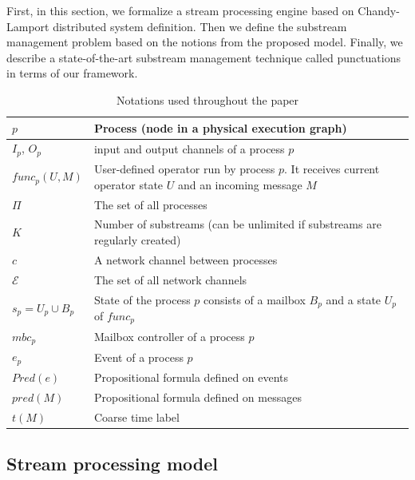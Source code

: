 \label{fs-acker-preliminaries}

First, in this section, we formalize a stream processing engine based on Chandy-Lamport distributed system definition. Then we define the substream management problem based on the notions from the proposed model. Finally, we describe a state-of-the-art substream management technique called punctuations in terms of our framework.

\begin{table}[!b]
    \caption{Notations used throughout the paper}
    \footnotesize
    \begin{tabular}{l|p{5cm}}
        \hline
        $p$ & Process (node in a physical execution graph) \\ 
        \hline
        $I_p$, $O_p$ & input and output channels of a process $p$ \\ 
        \hline
        $func_p(U, M)$ & User-defined operator run by process $p$. It receives current operator state $U$ and an incoming message $M$ \\ 
        \hline
        $\Pi$ & The set of all processes  \\
        \hline
        $K$ & Number of substreams (can be unlimited if substreams are regularly created) \\
        \hline
        $c$ & A network channel between processes  \\
        \hline
        $\mathcal{E}$ & The set of all network channels  \\
        \hline
        $s_p = U_p \cup B_p$ & State of the process $p$ consists of a mailbox $B_p$ and a state $U_p$ of $func_p$ \\
        \hline
        $mbc_{p}$ & Mailbox controller of a process $p$ \\
        \hline
        $e_{p}$ & Event of a process $p$ \\
        \hline
        $Pred(e)$ & Propositional formula defined on events \\
        \hline
        $pred(M)$ & Propositional formula defined on messages\\
        \hline
        $t(M)$ & Coarse time label \\
    \end{tabular}
    \label{notations}
\end{table}

\subsection{Stream processing model}
\label{fs-acker-processing-model}

